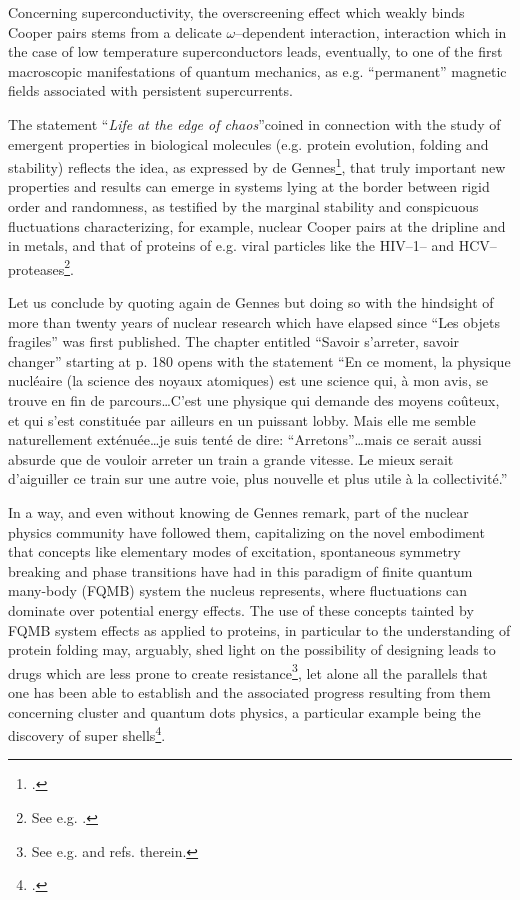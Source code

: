 \begin{subappendices}
Concerning superconductivity, the overscreening effect which  weakly binds Cooper pairs stems from a delicate $\omega$--dependent interaction, interaction which in the case of low temperature superconductors leads, eventually, to one of the first macroscopic manifestations of quantum mechanics, as e.g. ``permanent'' magnetic fields associated with persistent  supercurrents.

The statement ``\textit{Life at the edge of chaos}''coined in connection with the study of emergent properties in biological molecules (e.g. protein evolution, folding and stability) reflects the idea, as expressed by de Gennes\footnote{\cite{DeGennes:94}.}, that truly important new properties and results can emerge in systems lying at the border between rigid order and randomness, as testified by the marginal stability and conspicuous fluctuations characterizing, for example, nuclear Cooper pairs at the dripline and in metals, and that of proteins of e.g.  viral particles like the HIV--1-- and HCV--proteases\footnote{See e.g. \cite{Broglia:13b}.}.


 Let us conclude by quoting again de Gennes but doing so with the hindsight of more than twenty years of nuclear research which have elapsed since ``Les objets fragiles'' was first published. The chapter entitled  ``Savoir s'arreter, savoir changer'' starting at p. 180 opens with the statement ``En ce moment, la physique nucl\'eaire (la science des noyaux atomiques) est une science qui, \`a mon avis, se trouve en fin de parcours\dots C'est une physique qui demande des moyens co\^uteux, et qui s'est constitu\'ee par ailleurs en un puissant lobby. Mais elle me semble naturellement ext\'enu\'ee\dots je suis tent\'e de dire: ``Arretons''\dots mais ce serait aussi absurde que de vouloir arreter un train a grande vitesse. Le mieux serait d'aiguiller ce train sur une autre voie, plus nouvelle et plus utile \`a la collectivit\'e.''


In a way, and even without knowing de Gennes remark, part of the nuclear physics community have followed them, capitalizing on the novel embodiment that concepts like elementary modes of excitation, spontaneous symmetry breaking and phase transitions have had in this paradigm of finite quantum many-body (FQMB) system the nucleus represents, where fluctuations can dominate over potential energy effects. The use of these concepts tainted by  FQMB system effects as applied to proteins, in particular to the understanding of protein folding may, arguably, shed light on the possibility of designing leads to  drugs which are less prone to create resistance\footnote{See e.g. \cite{Broglia:13b,Broglia:05,Rosner:17} and refs. therein.}, let alone all the parallels that one has been able to establish and the associated progress resulting from them concerning cluster and quantum dots physics, a particular example being the discovery of super shells\footnote{\cite{Pedersen:91,deHeer:87,Brack:93,Pacheco:91,Lipparini:03,Martin:94,Bjornholm:94}.}.








\end{subappendices}
